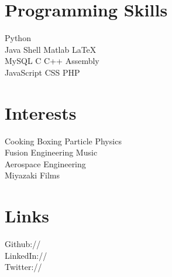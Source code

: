 \documentclass[]{deedy-resume-openfont}
\begin{document}
\begin{minipage}[t]{0.37\textwidth}
    \section{Programming Skills}
        Python \\
        Java \textbullet{}
        Shell \textbullet{}
        Matlab \textbullet{}
        \LaTeX\ \\
        MySQL \textbullet{}
        C \textbullet{}
        C++ \textbullet{}
        Assembly \\
        JavaScript \textbullet{}
        CSS \textbullet{}
        PHP \\
\end{minipage}
\hfill
\begin{minipage}[t]{0.32\textwidth}
    \section{Interests}
        Cooking \textbullet{}
        Boxing \textbullet{}
        Particle Physics \\
        Fusion Engineering \textbullet{}
        Music \\
        Aerospace Engineering \\
        Miyazaki Films
\end{minipage}
\hfill
\begin{minipage}[t]{0.30\textwidth}
    \section{Links}
        Github:// \href{https://github.com/paulkiernan}{}\\
        LinkedIn:// \href{https://www.linkedin.com/pub/paul-kiernan/24/a32/470}{}\\
        Twitter:// \href{https://twitter.com/gaelic}{}\\
\end{minipage}
\end{document}
